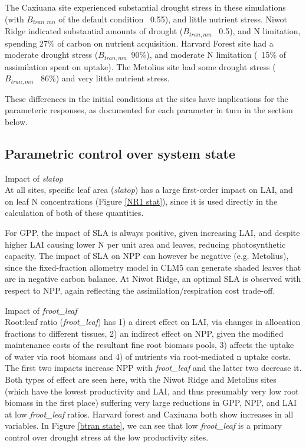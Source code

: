 \documentclass[draft,linenumbers]{agujournal}
\begin{document}
The Caxiuana site experienced substantial drought stress in these simulations (with $B_{tran,mn}$ of the default condition ~0.55), and little nutrient stress. Niwot Ridge indicated substantial amounts of drought ($B_{tran,mn}$ ~0.5), and N limitation, spending 27\% of carbon on nutrient acquisition. Harvard Forest site had a moderate drought stress ($B_{tran,mn}$~90\%), and moderate N limitation (~15\% of assimilation spent on uptake). The Metolius site had some drought stress ($B_{tran,mn}$ ~86\%) and very little nutrient stress. 

These differences in the initial conditions at the sites have implications for the parameteric responses, as documented for each parameter in turn in the section below. 

\subsection{Parametric control over system state}

Impact of \emph{slatop}\\
At all sites, specific leaf area (\emph{slatop}) has a large first-order impact on LAI,  and on leaf N concentrations (Figure \ref{NR1 stat}), since it is used directly in the calculation of both of these quantities. 

For GPP, the impact of SLA is always positive, given increasing LAI, and despite higher LAI causing lower N per unit area and leaves, reducing photosynthetic capacity. The impact of SLA on NPP can however be negative (e.g. Metolius), since the fixed-fraction allometry model in CLM5 can generate shaded leaves that are in negative carbon balance. At Niwot Ridge, an optimal SLA is observed with respect to NPP, again reflecting the assimilation/respiration cost trade-off.

Impact of \emph{froot\_leaf}\\
Root:leaf ratio (\emph{froot\_leaf}) has 1) a direct effect on LAI, via changes in allocation fractions to different tissues, 2) an indirect effect on NPP, given the modified maintenance costs of the resultant fine root biomass pools, 3) affects the uptake of water via root biomass and 4) of nutrients via root-mediated n uptake costs.  The first two impacts increase NPP with \emph{froot\_leaf} and the latter two decrease it.  Both types of effect are seen here, with the Niwot Ridge and Metolius sites (which have the lowest productivity and LAI, and thus presumably very low root biomass in the first place) suffering very large reductions in GPP, NPP, and LAI at low \emph{froot\_leaf} ratios.  Harvard forest and Caxiuana both show increases in all variables.  In Figure \ref{btran state}, we can see that low \emph{froot\_leaf} is a primary control over drought stress at the low productivity sites. 
\end{document}
